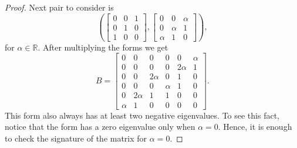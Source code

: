 \documentclass[12pt,openany]{book}
\newcommand{\R}{{\mathbb{R}}}
\theoremstyle{plain}
\theoremstyle{remark}
\theoremstyle{definition}
\theoremstyle{exercise}
\theoremstyle{example}
\begin{document}
\begin{proof}
Next pair to consider is
\begin{equation}
\left(
\begin{bmatrix}
       0 &        0 &        1\\
       0 &        1 &        0\\
       1 &        0 &        0
\end{bmatrix}
,
\begin{bmatrix}
       0 &        0 &   \alpha\\
       0 &   \alpha &        1\\
  \alpha &        1 &        0
\end{bmatrix}
\right) ,
\end{equation}
for $\alpha \in \R$.
After multiplying the forms we get
\begin{equation} \label{form2B}
B = \begin{bmatrix}
       0 &        0 &        0 &        0 &        0 &   \alpha\\
       0 &        0 &        0 &        0 &  2\alpha &        1\\
       0 &        0 &  2\alpha &        0 &        1 &        0\\
       0 &        0 &        0 &   \alpha &        1 &        0\\
       0 &  2\alpha &        1 &        1 &        0 &        0\\
  \alpha &        1 &        0 &        0 &        0 &        0
\end{bmatrix} .
\end{equation}
This form also always has at least two negative eigenvalues.  To see this fact,
notice that the form has a zero eigenvalue only when $\alpha = 0$.  Hence,
it is enough to check the signature of the matrix for $\alpha  = 0$.


\end{proof}
\end{document}
